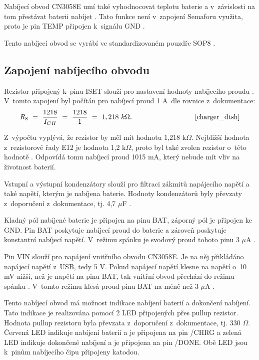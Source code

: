 Nabíjecí obvod CN3058E umí také vyhodnocovat teplotu baterie a v~závislosti na tom přestávat baterii nabíjet \cite{charger_dtsh}. Tato funkce není v~zapojení
Semaforu využita, proto je pin TEMP připojen k~signálu GND \cite{charger_dtsh}.

Tento nabíjecí obvod se vyrábí ve standardizovaném pouzdře SOP8 \cite{charger_dtsh}.

\subsection{Zapojení nabíjecího obvodu}
Rezistor připojený k~pinu ISET slouží pro nastavení hodnoty nabíjecího proudu \cite{charger_dtsh}. V~tomto zapojení byl počítán pro nabíjecí proud 1 A~dle rovnice
z~dokumentace: 
\begin{equation} 
  R_{8}~=~\frac{1218}{I_{CH}}~=~\frac{1218}{1}~=~1,218~k\Omega. 
  \quad \quad \quad \quad \quad \quad \quad \quad \quad \cite{charger_dtsh}
\label{eq:I_CH}
\end{equation}

Z~výpočtu vyplývá, že rezistor by měl mít hodnotu 1,218 k$\Omega$. Nejbližší hodnota z~rezistorové řady E12 je hodnota 1,2 k$\Omega$, proto byl také zvolen rezistor 
o~této hodnotě \cite{rezistorova_rada}. Odpovídá tomu nabíjecí proud 1015 mA, který nebude mít vliv na životnost baterií. 

Vstupní a výstupní kondenzátory slouží pro filtraci zákmitů napájecího napětí a také napětí, kterým je nabíjena baterie. Hodnoty kondenzátorů byly převzaty
z~doporučení z~dokumentace, tj. 4,7 $\mu$F \cite{charger_dtsh}.

Kladný pól nabíjené baterie je připojen na pinu BAT, záporný pól je připojen ke GND. Pin BAT poskytuje nabíjecí proud do baterie a zároveň poskytuje konstantní 
nabíjecí napětí. V~režimu spánku je svodový proud tohoto pinu 3 $\mu$A \cite{charger_dtsh}. 

Pin VIN slouží pro napájení vnitřního obvodu CN3058E. Je na něj přikládáno napájecí napětí z~USB, tedy 5 V. Pokud napájecí napětí klesne na napětí o~10 mV nižší, 
než je napětí na pinu BAT, tak vnitřní obvod přechází do režimu spánku \cite{charger_dtsh}. V~tomto režimu klesá proud pinu BAT na méně než 3 $\mu$A \cite{charger_dtsh}.

Tento nabíjecí obvod má možnost indikace nabíjení baterií a dokončení nabíjení. Tato indikace je realizována pomocí 2 LED připojených přes pullup rezistor. Hodnota
pullup rezistoru byla převzata z~doporučení z~dokumentace, tj. 330 $\Omega$. Červená LED indikuje nabíjení baterií a je připojena na pin /CHRG a zelená LED indikuje 
dokončené nabíjení a je připojena na pin /DONE. Obě LED jsou k~pinům nabíjecího čipu připojeny katodou. 

